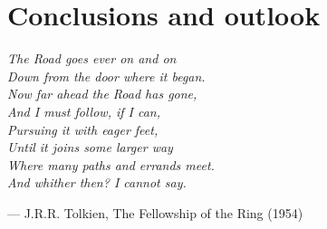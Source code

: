 \chapter{Conclusions and outlook}
\label{ch:Conclusions_and_outlook}

\ifsetDraft
\else
    \renewcommand{\CurrentTitleColor}{\color{black}}
    
    \vspace*{\fill}
    \setlength{\epigraphwidth}{0.6\textwidth}
    {\color{white} \epigraph{\textit{The Road goes ever on and on\\
                \hspace{2ex} Down from the door where it began.\\
                Now far ahead the Road has gone,\\
                \hspace{2ex} And I must follow, if I can,\\
                Pursuing it with eager feet,\\
                \hspace{2ex} Until it joins some larger way\\
                Where many paths and errands meet.\\
                \hspace{2ex} And whither then? I cannot say.}}{--- J.R.R. Tolkien, The Fellowship of the Ring (1954)}}
    \vspace*{\fill}
    
